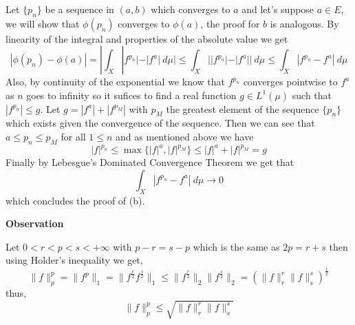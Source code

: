 \documentclass{article}
\begin{document}
\begin{exercise}
    Let $\{p_n\}$ be a sequence in $ \left( a,b \right) $ which converges to $a$ and let's suppose $a \in E$, we will show that $\phi \left( p_n \right) $ converges to $\phi \left( a \right) $, the proof for $b$ is analogous. By linearity of the integral and properties of the absolute value we get
    \[
        |\phi \left( p_n \right) - \phi \left( a \right) | = | \int_X |f^{p_n}| - |f^a|\: d\mu | \le \int_X ||f^{p_n}|-|f^a||\: d\mu \le \int_X |f^{p_n} - f^a|\: d\mu 
    \]
    Also, by continuity of the exponential we know that $f^{p_n}$ converges pointwise to $f^a$ as $n$ goes to infinity so it sufices to find a real function $g \in L^1 \left( \mu \right) $ such that $|f^{p_n}| \le g$. Let $g=|f^a|+|f^{p_M}|$ with $p_M$ the greatest element of the sequence $\{p_n\}$ which exists given the convergence of the sequence. Then we can see that $a \le p_n \le p_M$ for all $1 \le n$ and as mentioned above we have
    \[
        |f|^{p_n} \le \max \{ |f|^a , |f|^{p_M}\} \le |f|^a + |f|^{p_M} = g
    \]
    Finally by Lebesgue's Dominated Convergence Theorem we get that
    \[
        \int_X |f^{p_n} - f^a|\: d\mu \rightarrow 0   
    \]
    which concludes the proof of (b).

\bigbreak

\begin{observation}\textbf{Observation}

Let $0 < r < p < s < +\infty$ with $p-r=s-p$ which is the same as $2p=r+s$ then using Holder's inequality we get,  
\[
    \|f\|_p^p = \|f^p\|_1 = \|f^{\frac{r}{2}}f^{\frac{s}{2}}\|_1 \le \|f^{\frac{r}{2}}\|_2 \|f^{\frac{s}{2}}\|_2 = \left( \|f\|_r^r \|f\|_s^s   \right)^{\frac{1}{2}}    
\]
thus,
\[
    \|f\|_p^p \le \sqrt{\|f\|_r^r \|f\|_s^s  }   
\]
\end{observation}

\end{exercise}

\bigbreak
\end{document}
